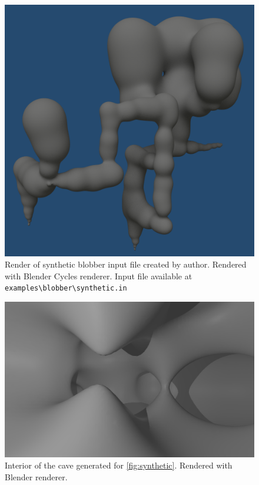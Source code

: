 \begin{figure}[htb]
  \begin{center}
    \includegraphics[width=\textwidth]{chapters/project/synthetic.png}
  \end{center}
  \caption{Render of synthetic blobber input file created by author. Rendered
    with Blender Cycles renderer. Input file available at \texttt{examples\textbackslash blobber\textbackslash synthetic.in}}
  \label{fig:synthetic}
\end{figure}

\begin{figure}[htb]
  \begin{center}
    \includegraphics[width=\textwidth]{chapters/project/interior.png}
  \end{center}
  \caption{Interior of the cave generated for \autoref{fig:synthetic}. Rendered with
Blender renderer.}
  \label{fig:interior}
\end{figure}
